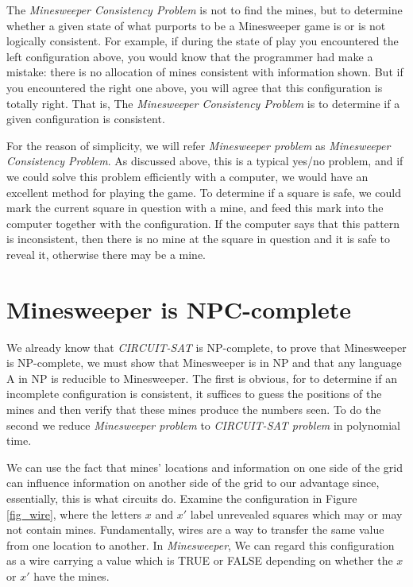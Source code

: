 \documentclass{article}
\begin{document}
The \textit{Minesweeper Consistency Problem} is not to find the mines, but to determine whether a given state of what purports to be a Minesweeper game is or is not logically consistent. For example, if during the state of play you encountered the left configuration above, you would know that the programmer had make a mistake: there is no allocation of mines consistent with information shown. But if you encountered the right one above, you will agree that this configuration is totally right. That is, The \textit{Minesweeper Consistency Problem} is to determine if a given configuration is consistent. 

For the reason of simplicity, we will refer \textit{Minesweeper problem} as \textit{Minesweeper Consistency Problem}. As discussed above, this is a typical yes/no problem, and if we could solve this problem efficiently with a computer, we would have an excellent method for playing the game. To determine if a square is safe, we could mark the current square in question with a mine, and feed this mark into the computer together with the configuration. If the computer says that this pattern is inconsistent, then there is no mine at the square in question and it is safe to reveal it, otherwise there may be a mine.


\section{Minesweeper is NPC-complete}

We already know that \textit{CIRCUIT-SAT} is NP-complete, to prove that Minesweeper is NP-complete, we must show that Minesweeper is in NP and that any language A in NP is reducible to Minesweeper. The first is obvious, for to determine if an incomplete configuration is consistent, it suffices to guess the positions of the mines and then verify that these mines produce the numbers seen. To do the second we reduce \textit{Minesweeper problem} to \textit{CIRCUIT-SAT problem} in polynomial time.

We can use the fact that mines’ locations and information on one side of the grid can influence information on another side of the grid to our advantage since, essentially, this is what circuits do. Examine the configuration in Figure \ref{fig_wire}, where the letters $x$ and $x'$ label unrevealed squares which may or may not contain mines. Fundamentally, wires are a way to transfer the same value from one location to another. In \textit{Minesweeper}, We can regard this configuration as a wire carrying a value which is TRUE or FALSE depending on whether the $x$ or $x'$ have the mines.
\end{document}
